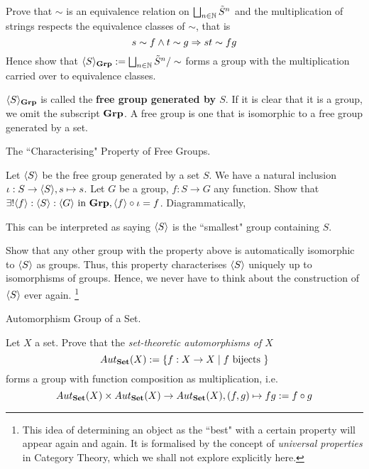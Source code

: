 \documentclass[../../book.tex]{subfiles}
\begin{document}
\begin{ex}
    Prove that $\sim$ is an equivalence relation on 
    $\bigsqcup_{n \in \mathbb{N}} \tilde{S}^n$
    and the multiplication of strings respects the equivalence classes of $\sim$,
    that is
    \[
        s \sim f \land t \sim g \Rightarrow st \sim fg
    \]
    Hence show that $\langle S \rangle_{\mathbf{Grp}} := 
    \bigsqcup_{n \in \mathbb{N}} \tilde{S}^n / \sim$
    forms a group with the multiplication carried over to equivalence classes. 
    
    $\langle S \rangle_{\mathbf{Grp}}$ is called the \textbf{free group generated by $S$}. 
    If it is clear that it is a group, we omit the subscript $\mathbf{Grp}$.
    A free group is one that is isomorphic to a free group generated by a set. 
\end{ex}

\begin{ex} \dolater The ``Characterising" Property of Free Groups. 

    Let $\langle S \rangle$ be the free group generated by a set $S$. 
    We have a natural inclusion $\iota : S \to \langle S \rangle, s \mapsto s$.
    Let $G$ be a group, $f : S \to G$ any function. 
    Show that 
    $\exists ! \langle f \rangle : \langle S \rangle : \langle G\rangle \text{ in } \mathbf{Grp}, 
    \langle f \rangle \circ \iota = f$. 
    Diagrammatically, 
    \begin{figure} [ht]
        \centering
    \end{figure}
    
    This can be interpreted as saying $\langle S \rangle$ is the 
    ``smallest" group containing $S$. 
    
    Show that any other group with the property above is automatically
    isomorphic to $\langle S \rangle$ as groups. 
    Thus, this property characterises $\langle S \rangle$ uniquely
    up to isomorphisms of groups. 
    Hence, we never have to think about 
    the construction of $\langle S \rangle$ ever again.
    \footnote{
        This idea of determining an object
        as the ``best" with a certain property will appear again and again. 
        It is formalised by the concept of \emph{universal properties} in Category Theory,
        which we shall not explore explicitly here. 
    }
\end{ex}

\begin{ex} Automorphism Group of a Set. 

    Let $X$ a set. Prove that the \emph{set-theoretic automorphisms of $X$}
    \[Aut_{\mathbf{Set}}(X) := \{f : X \to X \mid f \text{ bijects }\}\] forms a group
    with function composition as multiplication, i.e.
    \[
        Aut_{\mathbf{Set}}(X) \times Aut_{\mathbf{Set}}(X) \to Aut_{\mathbf{Set}}(X), 
        (f, g) \mapsto fg := f \circ g
    \]
\end{ex}
\end{document}
